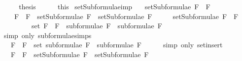 \begin{isabellebody}
\ \ \isamarkupfalse%
\ \isamarkupfalse%
\ {\isacharquery}thesis\isanewline
\ \ \ \ \isamarkupfalse%
\ this\isanewline
{}\isamarkupfalse%
%
\endisatagproof
{\isafoldproof}%
%
\isadelimproof
\isanewline
%
\endisadelimproof
\isanewline
{}\isamarkupfalse%
\ setSubformulae{\isacharunderscore}imp{\isacharcolon}\ \isanewline
\ \ {\isachardoublequoteopen}setSubformulae\ {\isacharparenleft}F{}\ \isactrlbold {\isasymrightarrow}\ F{}{\isacharparenright}\ \isanewline
\ \ \ {\isacharequal}\ {\isacharbraceleft}F{}\ \isactrlbold {\isasymrightarrow}\ F{}{\isacharbraceright}\ {\isasymunion}\ {\isacharparenleft}setSubformulae\ F{}\ {\isasymunion}\ setSubformulae\ F{}{\isacharparenright}{\isachardoublequoteclose}\isanewline
%
\isadelimproof
%
\endisadelimproof
%
\isatagproof
{}\isamarkupfalse%
\ {\isacharminus}\isanewline
\ \ \isamarkupfalse%
\ {\isachardoublequoteopen}setSubformulae\ {\isacharparenleft}F{}\ \isactrlbold {\isasymrightarrow}\ F{}{\isacharparenright}\ \isanewline
\ \ \ \ \ \ \ \ {\isacharequal}\ set\ {\isacharparenleft}{\isacharparenleft}F{}\ \isactrlbold {\isasymrightarrow}\ F{}{\isacharparenright}\ {\isacharhash}\ {\isacharparenleft}subformulae\ F{}\ {\isacharat}\ subformulae\ F{}{\isacharparenright}{\isacharparenright}{\isachardoublequoteclose}\isanewline
\ \ \ \ \isamarkupfalse%
\ {\isacharparenleft}simp\ only{\isacharcolon}\ subformulae{\isachardot}simps{\isacharparenleft}{}{\isacharparenright}{\isacharparenright}\isanewline
\ \ \isamarkupfalse%
\ \isamarkupfalse%
\ {\isachardoublequoteopen}{\isasymdots}\ {\isacharequal}\ {\isacharbraceleft}F{}\ \isactrlbold {\isasymrightarrow}\ F{}{\isacharbraceright}\ {\isasymunion}\ {\isacharparenleft}set\ {\isacharparenleft}subformulae\ F{}\ {\isacharat}\ subformulae\ F{}{\isacharparenright}{\isacharparenright}{\isachardoublequoteclose}\isanewline
\ \ \ \ \isamarkupfalse%
\ {\isacharparenleft}simp\ only{\isacharcolon}\ set{\isacharunderscore}insert{\isacharparenright}\isanewline
\ \ \isamarkupfalse%
\ \isamarkupfalse%
\ {\isachardoublequoteopen}{\isasymdots}\ {\isacharequal}\ {\isacharbraceleft}F{}\ \isactrlbold {\isasymrightarrow}\ F{}{\isacharbraceright}\ {\isasymunion}\ {\isacharparenleft}setSubformulae\ F{}\ {\isasymunion}\ setSubformulae\ F{}{\isacharparenright}{\isachardoublequoteclose}\isanewline

\end{isabellebody}
